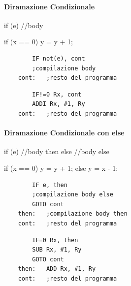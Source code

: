 \documentclass[10pt]{report}
\begin{document}
\paragraph{Diramazione Condizionale}
\begin{multicols}{2}
\begin{center}
	\begin{C}
	if (e) {
		//body
	}
	\end{C}
	\begin{C}
	if (x == 0) {
		y = y + 1;
	}
	\end{C}
\end{center}
\columnbreak
\begin{center}
	\begin{lstlisting}
		IF not(e), cont
		;compilazione body
	cont:	;resto del programma
	\end{lstlisting}
	\begin{lstlisting}
		IF!=0 Rx, cont
		ADDI Rx, #1, Ry
	cont:	;resto del programma
	\end{lstlisting}
\end{center}
\end{multicols}
\paragraph{Diramazione Condizionale con else}
\begin{multicols}{2}
\begin{center}
	\begin{C}
	if (e) {
		//body then
	} else {
		//body else
	}
	\end{C}
	\begin{C}
	if (x == 0) {
		y = y + 1;
	} else {
		y = x - 1;
	}
	\end{C}
\end{center}
\columnbreak
\begin{center}
	\begin{lstlisting}
		IF e, then
		;compilazione body else
		GOTO cont
	then:	;compilazione body then
	cont:	;resto del programma
	\end{lstlisting}
	\begin{lstlisting}
		IF=0 Rx, then
		SUB Rx, #1, Ry
		GOTO cont
	then:	ADD Rx, #1, Ry
	cont:	;resto del programma
	\end{lstlisting}
\end{center}
\end{multicols}
\pagebreak
\end{document}
